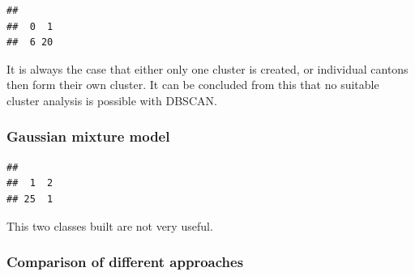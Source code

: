 \documentclass[
]{article}
\newenvironment{Shaded}{\begin{snugshade}}{\end{snugshade}}
\newcommand{\DocumentationTok}[1]{\textcolor[rgb]{0.56,0.35,0.01}{\textbf{\textit{#1}}}}
\newcommand{\FunctionTok}[1]{\textcolor[rgb]{0.00,0.00,0.00}{#1}}
\newcommand{\NormalTok}[1]{#1}
\newcommand{\OtherTok}[1]{\textcolor[rgb]{0.56,0.35,0.01}{#1}}
\newcommand{\SpecialCharTok}[1]{\textcolor[rgb]{0.00,0.00,0.00}{#1}}
\begin{document}
\begin{verbatim}
## 
##  0  1 
##  6 20
\end{verbatim}

It is always the case that either only one cluster is created, or
individual cantons then form their own cluster. It can be concluded from
this that no suitable cluster analysis is possible with DBSCAN.

\hypertarget{gaussian-mixture-model-1}{%
\subsubsection{Gaussian mixture model}\label{gaussian-mixture-model-1}}

\begin{Shaded}
\end{Shaded}

\begin{verbatim}
## 
##  1  2 
## 25  1
\end{verbatim}

This two classes built are not very useful.

\hypertarget{comparison-of-different-approaches-1}{%
\subsubsection{Comparison of different
approaches}\label{comparison-of-different-approaches-1}}
\end{document}
